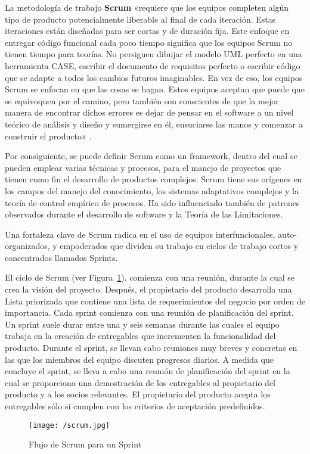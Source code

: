 La metodología de trabajo \textbf{Scrum} «requiere que los equipos completen algún tipo de producto potencialmente liberable al final de cada iteración. Estas iteraciones están diseñadas para ser cortas y de duración fija. Este enfoque en entregar código funcional cada poco tiempo significa que los equipos Scrum no tienen tiempo para teorías. No persiguen dibujar el modelo UML perfecto en una herramienta CASE, escribir el documento de requisitos perfecto o escribir código que se adapte a todos los cambios futuros imaginables. En vez de eso, los equipos Scrum se enfocan en que las cosas se hagan. Estos equipos aceptan que puede que se equivoquen por el camino, pero también son conscientes de que la mejor manera de encontrar dichos errores es dejar de pensar en el software a un nivel teórico de análisis y diseño y sumergirse en él, ensuciarse las manos y comenzar a construir el producto» \cite{scrum}.

Por consiguiente, se puede definir Scrum como un framework, dentro del cual se pueden emplear varias técnicas y procesos, para el manejo de proyectos que tienen como fin el desarrollo de productos complejos. Scrum tiene sus orígenes en los campos del manejo del conocimiento, los sistemas adaptativos complejos y la teoría de control empírico de procesos. Ha sido influenciado también de patrones observados durante el desarrollo de software y la Teoría de las Limitaciones.

Una fortaleza clave de Scrum radica en el uso de equipos interfuncionales, auto-organizados, y empoderados que dividen su trabajo en ciclos de trabajo cortos y concentrados llamados Sprints.

El ciclo de Scrum (ver Figura~\ref{fig:scrum}). comienza con una reunión, durante la cual se crea la visión del proyecto. Después, el propietario del producto desarrolla una Lista priorizada que contiene una lista de requerimientos del negocio por orden de importancia. 
Cada sprint comienza con una reunión de planificación del sprint. Un sprint suele durar entre una y seis semanas durante las cuales el equipo trabaja en la creación de entregables que incrementen la funcionalidad del producto. Durante el sprint, se llevan cabo reuniones muy breves y concretas en las que los miembros del equipo discuten progresos diarios. A medida que concluye el sprint, se lleva a cabo una reunión de planificación del sprint en la cual se proporciona una demostración de los entregables al propietario del producto y a los socios relevantes. El propietario del producto acepta los entregables sólo si cumplen con los criterios de aceptación predefinidos.

\begin{figure}[!h]
\begin{center}
\texttt{[image: /scrum.jpg]}
\caption[Flujo de Scrum para un Sprint]{Flujo de Scrum para un Sprint}
\label{fig:scrum}
\end{center}
\end{figure}


